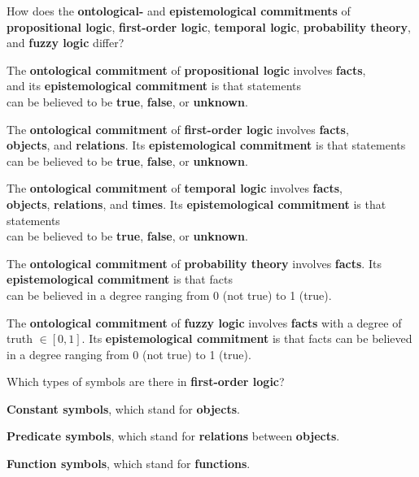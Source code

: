 
\begin{flashcard}[Question]{How does the \textbf{ontological-} and \textbf{epistemological commitments} of \textbf{propositional logic}, \textbf{first-order logic}, \textbf{temporal logic}, \textbf{probability theory}, and \textbf{fuzzy logic} differ?}
\footnotesize
\begin{center}
The \textbf{ontological commitment} of \textbf{propositional logic} involves \textbf{facts},\\and its \textbf{epistemological commitment} is that statements\\can be believed to be \textbf{true}, \textbf{false}, or \textbf{unknown}.

\medskip

The \textbf{ontological commitment} of \textbf{first-order logic} involves \textbf{facts},\\\textbf{objects}, and \textbf{relations}. Its \textbf{epistemological commitment} is that statements\\can be believed to be \textbf{true}, \textbf{false}, or \textbf{unknown}.

\medskip

The \textbf{ontological commitment} of \textbf{temporal logic} involves \textbf{facts},\\\textbf{objects}, \textbf{relations}, and \textbf{times}. Its \textbf{epistemological commitment} is that statements\\can be believed to be \textbf{true}, \textbf{false}, or \textbf{unknown}.

\medskip

The \textbf{ontological commitment} of \textbf{probability theory} involves \textbf{facts}. Its \textbf{epistemological commitment} is that facts\\can be believed in a degree ranging from 0 (not true) to 1 (true).

\medskip

The \textbf{ontological commitment} of \textbf{fuzzy logic} involves \textbf{facts} with a degree of truth $\in [0,1]$. Its \textbf{epistemological commitment} is that facts can be believed in a degree ranging from 0 (not true) to 1 (true).
\end{center}
\end{flashcard}

\begin{flashcard}[Question]{Which types of symbols are there in \textbf{first-order logic}?}
\begin{center}
\textbf{Constant symbols}, which stand for \textbf{objects}.

\medskip

\textbf{Predicate symbols}, which stand for \textbf{relations} between \textbf{objects}.

\medskip

\textbf{Function symbols}, which stand for \textbf{functions}.
\end{center}
\end{flashcard}

